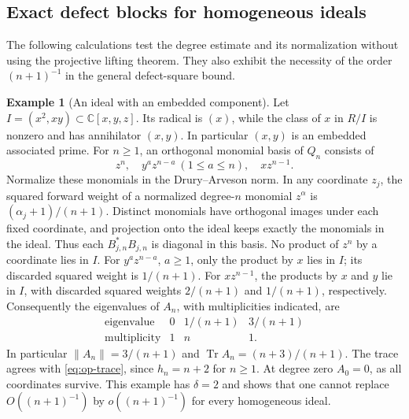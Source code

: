 \documentclass[11pt,reqno]{amsart}
\numberwithin{equation}{section}
\theoremstyle{definition}
\newtheorem{example}[theorem]{Example}
\theoremstyle{remark}
\newcommand{\C}{\mathbb C}
\DeclareMathOperator{\Tr}{Tr}
\begin{document}
\subsection{Exact defect blocks for homogeneous ideals}

The following calculations test the degree estimate and its normalization
without using the projective lifting theorem. They also exhibit the
necessity of the order $(n+1)^{-1}$ in the general defect-square bound.

\begin{example}[An ideal with an embedded component]\label{ext:embedded-defect}
Let $I=(x^2,xy)\subset\C[x,y,z]$. Its radical is $(x)$, while the class
of $x$ in $R/I$ is nonzero and has annihilator $(x,y)$. In particular
$(x,y)$ is an embedded associated prime. For $n\geq1$, an orthogonal
monomial basis of $Q_n$ consists of
\[
 z^n,\quad y^a z^{n-a}\ (1\leq a\leq n),\quad xz^{n-1}.
\]
Normalize these monomials in the Drury--Arveson norm. In any coordinate
$z_j$, the squared forward weight of a normalized degree-$n$ monomial
$z^\alpha$ is $(\alpha_j+1)/(n+1)$. Distinct monomials have orthogonal
images under each fixed coordinate, and projection onto the ideal
keeps exactly the monomials in the ideal. Thus each $B_{j,n}^*B_{j,n}$
is diagonal in this basis. No product of $z^n$ by a coordinate lies in
$I$. For $y^a z^{n-a}$, $a\geq1$, only the product by $x$ lies in $I$;
its discarded squared weight is $1/(n+1)$. For $xz^{n-1}$, the products
by $x$ and $y$ lie in $I$, with discarded squared weights $2/(n+1)$
and $1/(n+1)$, respectively. Consequently the eigenvalues of $A_n$,
with multiplicities indicated, are
\begin{equation}\label{eq:embedded-spectrum}
 \begin{array}{c|ccc}
 \text{eigenvalue}&0&1/(n+1)&3/(n+1)\\
 \text{multiplicity}&1&n&1.
 \end{array}
\end{equation}
In particular $\|A_n\|=3/(n+1)$ and $\Tr A_n=(n+3)/(n+1)$.
The trace agrees with \eqref{eq:op-trace}, since $h_n=n+2$ for
$n\geq1$. At degree zero $A_0=0$, as all coordinates survive.
This example has $\delta=2$ and shows that one cannot replace
$O((n+1)^{-1})$ by $o((n+1)^{-1})$ for every homogeneous ideal.
\end{example}
\end{document}
